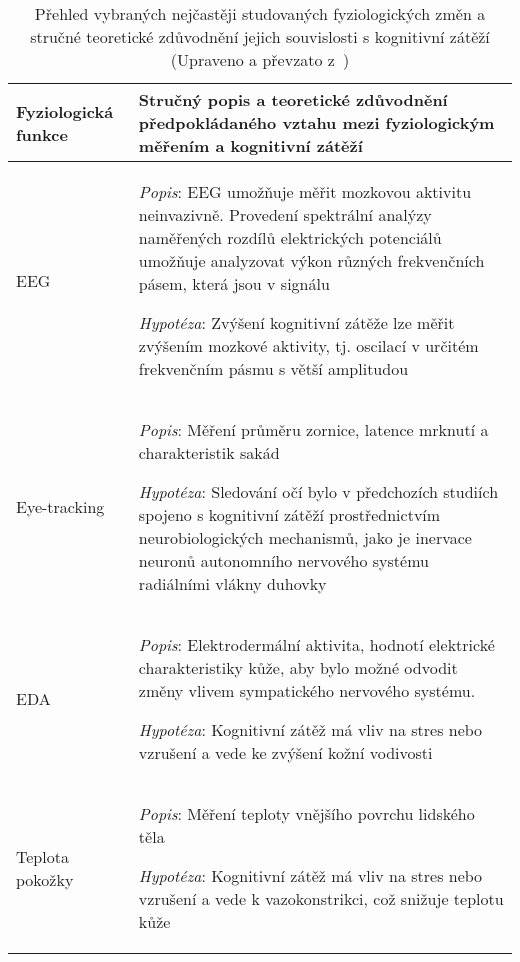 \begin{table}[ht]
    \renewcommand{\arraystretch}{1.5}
    \centering
    \begin{threeparttable}
        \caption{Přehled vybraných nejčastěji studovaných fyziologických změn
            a stručné teoretické zdůvodnění jejich souvislosti s kognitivní zátěží
            (Upraveno a převzato z~\cite{Vanneste2021})}
        \label{tab:prehled_fyziologicke_projevy_CL_tab1}
        \scriptsize
        \begin{tabular}{p{3cm}p{11cm}}
            \toprule
            Fyziologická funkce & Stručný popis a teoretické zdůvodnění předpokládaného vztahu mezi fyziologickým měřením a kognitivní zátěží
            \\ \midrule
            EEG                 & \textit{Popis}: \gls{EEG} umožňuje měřit mozkovou aktivitu neinvazivně. Provedení spektrální analýzy naměřených rozdílů elektrických potenciálů umožňuje analyzovat výkon různých frekvenčních pásem, která jsou v signálu\newline
            \rule{0pt}{2.5ex}\noindent
            \textit{Hypotéza}: Zvýšení kognitivní zátěže lze měřit zvýšením mozkové aktivity, tj. oscilací v určitém frekvenčním pásmu s větší amplitudou~\cite{Antonenko2010}
            \\
            Eye-tracking        & \textit{Popis}: Měření průměru zornice, latence mrknutí a charakteristik sakád\newline
            \rule{0pt}{2.5ex}\noindent
            \textit{Hypotéza}: Sledování očí bylo v předchozích studiích spojeno s kognitivní zátěží prostřednictvím neurobiologických mechanismů, jako je inervace neuronů autonomního nervového systému radiálními vlákny duhovky~\cite{Wel2018}
            \\
            EDA                 & \textit{Popis}: Elektrodermální aktivita, hodnotí elektrické charakteristiky kůže, aby bylo možné odvodit změny vlivem sympatického nervového systému.\newline
            \rule{0pt}{2.5ex}\noindent
            \textit{Hypotéza}: Kognitivní zátěž má vliv na stres nebo vzrušení a vede ke zvýšení kožní vodivosti~\cite{Setz2010}
            \\
            Teplota pokožky     & \textit{Popis}: Měření teploty vnějšího povrchu lidského těla\newline
            \rule{0pt}{2.5ex}\noindent
            \textit{Hypotéza}: Kognitivní zátěž má vliv na stres nebo vzrušení a vede k vazokonstrikci, což snižuje teplotu kůže~\cite{Herborn2015}

\end{tabular}
\end{threeparttable}
\end{table}
